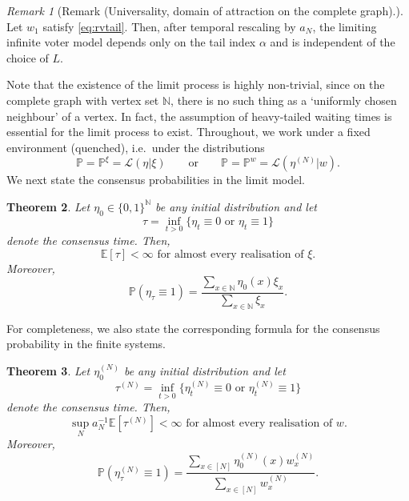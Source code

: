 \documentclass[11pt,a4paper]{scrartcl}
\numberwithin{equation}{section}
\theoremstyle{plain}
\newtheorem{theorem}{Theorem}[section]
\theoremstyle{definition}
\theoremstyle{remark}
\newtheorem{remark}[theorem]{Remark}
\newcommand{\bE}{\ensuremath{\mathbb{E}}}
\newcommand{\bN}{\ensuremath{\mathbb{N}}}
\newcommand{\bP}{\ensuremath{\mathbb{P}}}
\begin{document}
\begin{remark}[Remark (Universality, domain of attraction on the complete graph).]
Let $w_1$ satisfy \eqref{eq:rvtail}. Then, after temporal rescaling by $a_N$, the limiting infinite voter model depends only on the tail index $\alpha$ and is independent of the choice of $L$. %
\end{remark}
Note that the existence of the limit process is highly non-trivial, since on the complete graph with vertex set $\bN$, there is no such thing as a `uniformly chosen neighbour' of a vertex. In fact, the assumption of heavy-tailed waiting times is essential for the limit process to exist. Throughout, we work under a fixed environment (quenched), i.e.\ under the distributions
$$\bP=\bP^{\xi}=\mathcal{L}(\eta|\xi)\qquad\text{or}\qquad\bP=\bP^{w}=\mathcal{L}(\eta^{(N)}|w).$$
We next state the consensus probabilities in the limit model.
\begin{theorem}\label{thm:limitvotermodel2}
Let $\eta_0\in\{0,1\}^{\bN}$ be any initial distribution and let
\[\tau=\inf_{t>0}\{\eta_t\equiv 0 \text{ or } \eta_t\equiv 1\}\]
denote the consensus time. Then,
\[
\bE[\tau]<\infty \text{ for almost every realisation of }\xi.
\]
Moreover,
\begin{equation}\label{eq:fixationprobformula}
\bP(\eta_{\tau}\equiv 1)=\frac{\sum_{x\in\bN}\eta_0(x)\xi_x}{\sum_{x\in\bN}\xi_x}.
\end{equation}
\end{theorem}
For completeness, we also state the corresponding formula for the consensus probability in the finite systems.
\begin{theorem}\label{thm:votermodelconsensus}
	Let $\eta_0^{(N)}$ be any initial distribution and let
	\[\tau^{(N)}=\inf_{t>0}\{\eta_t^{(N)}\equiv 0 \text{ or } \eta_t^{(N)}\equiv 1\}\]
	denote the consensus time. 
	Then,
	\[
	\sup_{N} a_N^{-1} \bE[\tau^{(N)}]<\infty \text{ for almost every realisation of }w.
	\]
	Moreover,
	\begin{equation}\label{eq:fixationformula2}
	\bP(\eta_{\tau}^{(N)}\equiv 1)=\frac{\sum_{x\in[N]}\eta^{(N)}_0(x) w_x^{(N)}}{\sum_{x\in[N]}w^{(N)}_x}.
	\end{equation}
\end{theorem}
\end{document}
